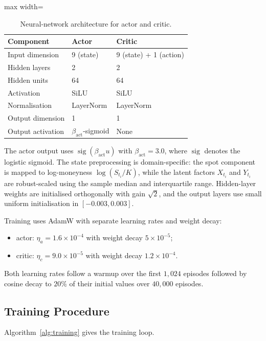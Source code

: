 \documentclass[a4paper,fleqn]{cas-dc}
\begin{document}
\begin{table}[htbp]
\centering
\caption{Neural-network architecture for actor and critic.}
\label{tab:network_arch}
\begin{adjustbox}{max width=\linewidth}
\begin{tabular}{lll}
\toprule
Component & Actor & Critic \\
\midrule
Input dimension & 9 (state) & 9 (state) + 1 (action) \\
Hidden layers & 2 & 2 \\
Hidden units & 64 & 64 \\
Activation & SiLU & SiLU \\
Normalisation & LayerNorm & LayerNorm \\
Output dimension & 1 & 1 \\
Output activation & $\beta_{\mathrm{act}}$-sigmoid & None \\
\bottomrule
\end{tabular}
\end{adjustbox}
\end{table}

The actor output uses $\operatorname{sig}(\beta_{\mathrm{act}} u)$ with $\beta_{\mathrm{act}} = 3.0$, where $\operatorname{sig}$ denotes the logistic sigmoid. The state preprocessing is domain-specific: the spot component is mapped to log-moneyness $\log(S_{t_i}/K)$, while the latent factors $X_{t_i}$ and $Y_{t_i}$ are robust-scaled using the sample median and interquartile range. Hidden-layer weights are initialised orthogonally with gain $\sqrt{2}$, and the output layers use small uniform initialisation in $[-0.003,0.003]$.

Training uses AdamW with separate learning rates and weight decay:
\begin{itemize}
    \item actor: $\eta_a = 1.6 \times 10^{-4}$ with weight decay $5 \times 10^{-5}$;
    \item critic: $\eta_c = 9.0 \times 10^{-5}$ with weight decay $1.2 \times 10^{-4}$.
\end{itemize}
Both learning rates follow a warmup over the first $1{,}024$ episodes followed by cosine decay to $20\%$ of their initial values over $40{,}000$ episodes.

\subsection{Training Procedure}
\label{sec:training}

Algorithm~\ref{alg:training} gives the training loop.
\end{document}
